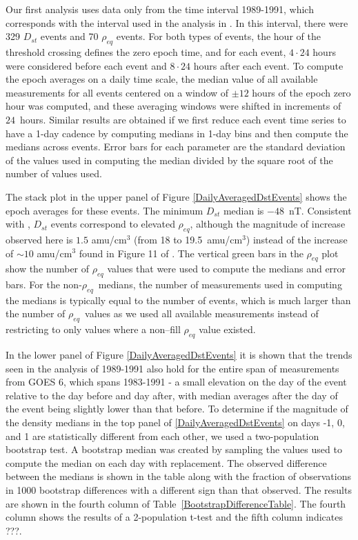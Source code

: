 \documentclass[10pt,twocolumn]{article}
\newcommand{\req}{\ensuremath{\rho_{eq}}}
\begin{document}
Our first analysis uses data only from the time interval 1989-1991, which corresponds with the interval used in the analysis in \cite{Takahashi2010}. In this interval, there were 329 $D_{st}$ events and 70 $\rho_{eq}$ events.  For both types of events, the hour of the threshold crossing defines the zero epoch time, and for each event, $4\cdot24$ hours were considered before each event and $8\cdot24$ hours after each event.  To compute the epoch averages on a daily time scale, the median value of all available measurements for all events centered on a window of $\pm 12$ hours of the epoch zero hour was computed, and these averaging windows were shifted in increments of $24$~hours. Similar results are obtained if we first reduce each event time series to have a 1-day cadence by computing medians in 1-day bins and then compute the medians across events.  Error bars for each parameter are the standard deviation of the values used in computing the median divided by the square root of the number of values used.

The stack plot in the upper panel of Figure \ref{DailyAveragedDstEvents} shows the epoch averages for these events.  The minimum $D_{st}$ median is $-48$~nT.  Consistent with \cite{Takahashi2010}, $D_{st}$ events correspond to elevated $\rho_{eq}$, although the magnitude of increase observed here is $1.5$ amu/cm$^3$ (from 18 to 19.5~amu/cm$^3$) instead of the increase of $\sim 10$ amu/cm$^3$ found in Figure 11 of \cite{Takahashi2010}.  The vertical green bars in the $\rho_{eq}$ plot show the number of $\rho_{eq}$ values that were used to compute the medians and error bars.  For the non-\req\ medians, the number of measurements used in computing the medians is typically equal to the number of events, which is much larger than the number of \req\ values as we used all available measurements instead of restricting to only values where a non--fill $\rho_{eq}$ value existed.

In the lower panel of Figure \ref{DailyAveragedDstEvents} it is shown that the trends seen in the analysis of 1989-1991 also hold for the entire span of measurements from GOES 6, which spans 1983-1991 - a small elevation on the day of the event relative to the day before and day after, with median averages after the day of the event being slightly lower than that before.  
To determine if the magnitude of the density medians in the top panel of \ref{DailyAveragedDstEvents} on days -1, 0, and 1 are statistically different from each other, we used a two-population bootstrap test.  A bootstrap median was created by sampling the values used to compute the median on each day with replacement.  The observed difference between the medians is shown in the table along with the fraction of observations in 1000 bootstrap differences with a different sign than that observed.  The results are shown in the fourth column of Table~\ref{BootstrapDifferenceTable}. The fourth column shows the results of a 2-population t-test and the fifth column indicates ???.
\end{document}
